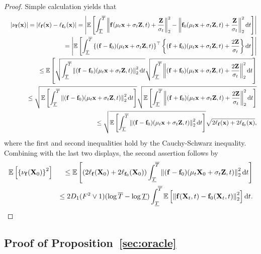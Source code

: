 \documentclass[twoside,11pt]{article}
\newcommand{\bff}{{\bf f}}
\newcommand{\bx}{{\bf x}}
\newcommand{\bX}{{\bf X}}
\newcommand{\bZ}{{\bf Z}}
\newcommand{\bbE}{{\mathbb E}}
\newcommand{\bean}{\setlength\arraycolsep{1pt}\begin{eqnarray*}}
\newcommand{\eean}{\end{eqnarray*}}
\def\d{{\rm d}}
\begin{document}
\begin{proof}
Simple calculation yields that
\bean
 && \vert \nu_{\bff}(\bx) \vert = \vert \ell_{\bff}(\bx) - \ell_{\bff_0}(\bx) \vert
= \left\vert \bbE \left[ \int_{\underline{T}}^{\overline{T}} \left\| \bff(\mu_t \bx + \sigma_t \bZ,t) + \frac{\bZ}{\sigma_t} \right\|_2^2 - \left\| \bff_0(\mu_t \bx + \sigma_t \bZ,t) + \frac{\bZ}{\sigma_t} \right\|_2^2 \d t   \right] \right\vert
\\
&& = \left\vert \bbE \left[ \int_{\underline{T}}^{\overline{T}} \left\{ (\bff - \bff_0) (\mu_t \bx + \sigma_t \bZ,t)  \right\}^{\top} \left\{ (\bff + \bff_0) (\mu_t \bx + \sigma_t \bZ,t)  + \frac{2\bZ}{\sigma_t} \right\} \d t
\right] \right\vert
\\
&& \leq \bbE\left[  \sqrt{ \int_{\underline{T}}^{\overline{T}} \left\| (\bff - \bff_0)(\mu_t \bx + \sigma_t \bZ,t)  \right\|_2^2 \d t }
\sqrt{ \int_{\underline{T}}^{\overline{T}} \left\| (\bff + \bff_0)(\mu_t \bx + \sigma_t \bZ,t) + \frac{2\bZ}{\sigma_t}  \right\|_2^2 \d t }
\right]
\\
&& \leq \sqrt{ \bbE\left[ \int_{\underline{T}}^{\overline{T}} \left\| (\bff - \bff_0)(\mu_t \bx + \sigma_t \bZ,t)  \right\|_2^2 \d t  \right] }
\sqrt{ \bbE\left[ 
 \int_{\underline{T}}^{\overline{T}} \left\| (\bff + \bff_0)(\mu_t \bx + \sigma_t \bZ,t) + \frac{2\bZ}{\sigma_t}  \right\|_2^2 \d t 
\right] }
\\
&& \leq \sqrt{ \bbE\left[ \int_{\underline{T}}^{\overline{T}} \left\| (\bff - \bff_0)(\mu_t \bx + \sigma_t \bZ,t)  \right\|_2^2 \d t  \right] }
\sqrt{ 2 \ell_{\bff}(\bx) + 2 \ell_{\bff_0}(\bx) },
\eean
where the first and second inequalities hold by the Cauchy-Schwarz inequality.
Combining with the last two displays, the second assertion follows by
\bean
\bbE \left[ \left\{ \nu_{\bff}(\bX_0) \right\}^2 \right]
&& \leq \bbE\left[  \left( 2 \ell_{\bff}(\bX_0) + 2 \ell_{\bff_0}(\bX_0) \right) \int_{\underline{T}}^{\overline{T}} \left\| (\bff - \bff_0)(\mu_t \bX_0 + \sigma_t \bZ,t)  \right\|_2^2 \d t 
\right]
\\
&& \leq 2 D_{1} (F^2 \vee 1) (\log \overline{T} - \log \underline{T}) \int_{\underline{T}}^{\overline{T}} \bbE \left[ \left\| \bff(\bX_t,t)  - \bff_0(\bX_t,t) \right\|_2^2 \right]  \d t .
\eean
\end{proof}

\subsection{  Proof of Proposition~\ref{sec:oracle} }
\end{document}
